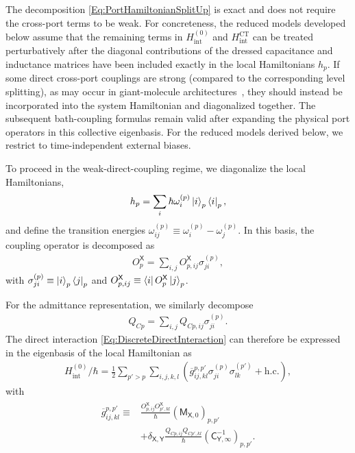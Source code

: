 \documentclass[prx,aps,twocolumn,article]{revtex4-2}
\newcommand{\msf}[1]{\mathsf{#1}}
\newcommand{\hc}{\mathrm{h.c.}}
\newcommand{\msY}{\msf{Y}}
\newcommand{\msC}{\msf{C}}
\newcommand{\msM}{\msf{M}}
\newcommand{\msX}{\msf{X}}
\begin{document}
The decomposition \cref{Eq:PortHamiltonianSplitUp} is exact and does not require the cross-port terms to be weak. For concreteness, the reduced models developed below assume that the remaining terms in $H_{\mathrm{int}}^{(0)}$ and $H_{\mathrm{int}}^{\mathrm{CT}}$ can be treated perturbatively after the diagonal contributions of the dressed capacitance and inductance matrices have been included exactly in the local Hamiltonians $h_p$. If some direct cross-port couplings are strong (compared to the corresponding level splitting), as may occur in giant-molecule architectures~\cite{Gheeraert:2020}, they should instead be incorporated into the system Hamiltonian and diagonalized together. The subsequent bath-coupling formulas remain valid after expanding the physical port operators in this collective eigenbasis. For the reduced models derived below, we restrict to time-independent external biases.

To proceed in the weak-direct-coupling regime, we diagonalize the local Hamiltonians,
\begin{align}
    h_p
    =
    \sum_i
    \hbar\omega_i^{(p)}
    \ket{i}_p\bra{i}_p,
    \label{Eq:DiagonalizedPortHamiltonian}
\end{align}
and define the transition energies $\omega_{ij}^{(p)}\equiv\omega_i^{(p)}-\omega_j^{(p)}$. In this basis, the coupling operator is decomposed as
\begin{align}
    O_{p}^{\msX}
    =
    \sum_{i,j}
    O_{p,ij}^{\msX}
    \sigma_{ji}^{(p)},
\label{Eq:DiscreteOperatorExpansion}
\end{align}
with $\sigma_{ji}^{(p)}\equiv\ket{i}_p\bra{j}_p$ and $O_{p,ij}^{\msX}\equiv\bra{i}O_{p}^{\msX}\ket{j}_p$.

For the admittance representation, we similarly decompose
\begin{align}
    Q_{Cp}
    =
    \sum_{i,j}
    Q_{Cp,ij}
    \sigma_{ji}^{(p)}.
\end{align}
The direct interaction \cref{Eq:DiscreteDirectInteraction} can therefore be expressed in the eigenbasis of the local Hamiltonian as
\begin{align}
    H_{\mathrm{int}}^{(0)}/\hbar
    =\frac{1}{2}
    \sum_{p'>p}
    \sum_{i,j,k,l}
    \left(
        \overline{g}_{ij,kl}^{p,p'}
        \sigma_{ji}^{(p)}
        \sigma_{lk}^{(p')}
        +
        \hc
    \right),
\label{Eq:DirectInteraction}
\end{align}
with
\begin{align}
\begin{aligned}
    \overline{g}_{ij,kl}^{p,p'}
    \equiv{}&
    \frac{
        O_{p,ij}^{\msX}
        O_{p',kl}^{\msX}
    }{\hbar}
    \left(\msM_{\msX,0}\right)_{p,p'}
    \\
    &+
    \delta_{\msX,\msY}
    \frac{
        Q_{Cp,ij}
        Q_{Cp',kl}
    }{\hbar}
    \left(
        \msC_{\msY,\infty}^{-1}
    \right)_{p,p'}.
\end{aligned}
\end{align}
\end{document}
